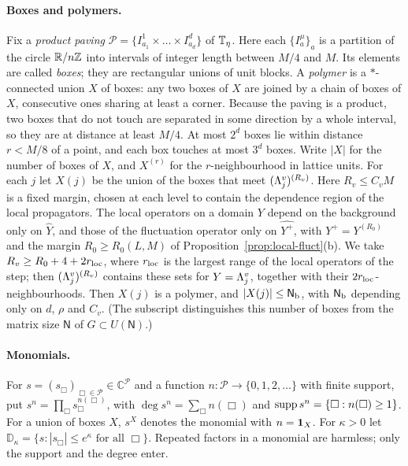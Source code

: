 \paragraph{Boxes and polymers.} Fix a \emph{product paving} $\mathcal P=\{I^1_{a_1}\times\dots\times I^d_{a_d}\}$ of $\mathbb T_\eta$. Here each $\{I^\mu_a\}_a$ is a partition of the circle $\mathbb R/n\mathbb Z$ into intervals of integer length between $M/4$ and $M$. Its elements are called \emph{boxes}; they are rectangular unions of unit blocks. A \emph{polymer} is a $*$-connected union $X$ of boxes: any two boxes of $X$ are joined by a chain of boxes of $X$, consecutive ones sharing at least a corner. Because the paving is a product, two boxes that do not touch are separated in some direction by a whole interval, so they are at distance at least $M/4$. At most $2^d$ boxes lie within distance $r<M/8$ of a point, and each box touches at most $3^d$ boxes. Write $|X|$ for the number of boxes of $X$, and $X^{(r)}$ for the $r$-neighbourhood in lattice units. For each $j$ let $X(j)$ be the union of the boxes that meet $(\Lambda^v_j)^{(R_v)}$. Here $R_v\le C_vM$ is a fixed margin, chosen at each level to contain the dependence region of the local propagators. The local operators on a domain $Y$ depend on the background only on $\hat Y$, and those of the fluctuation operator only on $\widehat{Y^+}$, with $Y^+=Y^{(R_0)}$ and the margin $R_0\ge R_0(L,M)$ of Proposition~\ref{prop:local-fluct}(b). We take $R_v\ge R_0+4+2r_{\rm loc}$, where $r_{\rm loc}$ is the largest range of the local operators of the step; then $(\Lambda^v_j)^{(R_v)}$ contains these sets for $Y=\Lambda^v_j$, together with their $2r_{\rm loc}$-neighbourhoods. Then $X(j)$ is a polymer, and $|X(j)|\le\mathsf N_{\rm b}$, with $\mathsf N_{\rm b}$ depending only on $d$, $\rho$ and $C_v$. (The subscript distinguishes this number of boxes from the matrix size $\mathsf N$ of $G\subset U(\mathsf N)$.)

\paragraph{Monomials.} For $s=(s_\Box)_{\Box\in\mathcal P}\in\mathbb C^{\mathcal P}$ and a function $n:\mathcal P\to\{0,1,2,\dots\}$ with finite support, put $s^n=\prod_\Box s_\Box^{n(\Box)}$, with $\deg s^n=\sum_\Box n(\Box)$ and $\operatorname{supp} s^n=\{\Box:n(\Box)\ge1\}$. For a union of boxes $X$, $s^X$ denotes the monomial with $n=\mathbf 1_X$. For $\kappa>0$ let $\mathbb D_\kappa=\{s:|s_\Box|\le e^\kappa\text{ for all }\Box\}$. Repeated factors in a monomial are harmless; only the support and the degree enter.

